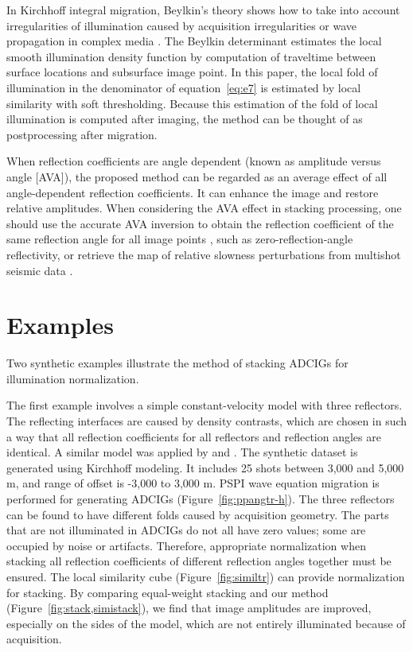 
In Kirchhoff integral migration, Beylkin's theory \cite[]{Beylkin} shows how to take into account irregularities of illumination caused by acquisition irregularities or wave propagation in complex media \cite[]{Audebert}. The Beylkin determinant estimates the local smooth illumination density function by computation of traveltime between surface locations and subsurface image point. In this paper, the local fold of illumination in the denominator of equation~\ref{eq:e7} is estimated by local similarity with soft thresholding. Because this estimation of the fold of local illumination is computed after imaging, the method can be thought of as postprocessing after migration. 

When reflection coefficients are angle dependent (known as amplitude versus angle [AVA]), the proposed method can be regarded as an average effect of all angle-dependent reflection coefficients. It can enhance the image and restore relative amplitudes. When considering the AVA effect in stacking processing, one should use the accurate AVA inversion to obtain the reflection coefficient of the same reflection angle for all image points \cite[]{Kuhl}, such as zero-reflection-angle reflectivity, or retrieve the map of relative slowness perturbations from multishot seismic data \cite[]{Kiyashchenko}.

\section{Examples}

Two synthetic examples illustrate the method of stacking ADCIGs for illumination normalization.

The first example involves a simple constant-velocity model with three reflectors. The reflecting interfaces are caused by density contrasts, which are chosen in such a way that all reflection coefficients for all reflectors and reflection angles are identical. A similar model was applied by \cite{Zhang2003} and \cite{Schleicher}. The synthetic dataset is generated using Kirchhoff modeling. It includes 25 shots between 3,000 and 5,000 m, and range of offset is -3,000 to 3,000 m. PSPI wave equation migration is performed for generating ADCIGs (Figure~\ref{fig:ppangtr-h}). The three reflectors can be found to have different folds caused by acquisition geometry. The parts that are not illuminated in ADCIGs do not all have zero values; some are occupied by noise or artifacts. Therefore, appropriate normalization when stacking all reflection coefficients of different reflection angles together must be ensured. The local similarity cube (Figure~\ref{fig:similtr}) can provide normalization for stacking. By comparing equal-weight stacking and our method (Figure~\ref{fig:stack,simistack}), we find that image amplitudes are improved, especially on the sides of the model, which are not entirely illuminated because of acquisition.

